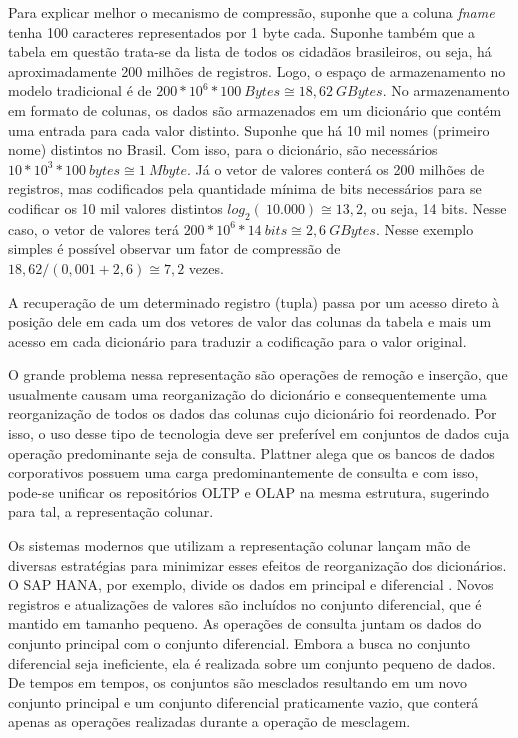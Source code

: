 Para explicar melhor o mecanismo de compressão, suponhe que a coluna \emph{fname} tenha 
100 caracteres representados por 1 byte cada. Suponhe também que a tabela em questão trata-se 
da lista de todos os cidadãos brasileiros, ou seja, há aproximadamente 200 milhões de registros. 
Logo, o espaço de armazenamento no modelo tradicional é de $200*10^6 * 100~Bytes \cong 18,62~GBytes$. 
No armazenamento em formato de colunas, os dados são armazenados em um dicionário que contém uma 
entrada para cada valor distinto. Suponhe que há 10 mil nomes (primeiro nome) distintos no Brasil. 
Com isso, para o dicionário, são necessários $10*10^3 * 100~bytes \cong 1~Mbyte$. Já o vetor de 
valores conterá os 200 milhões de registros, mas codificados pela quantidade mínima de bits 
necessários para se codificar os 10 mil valores distintos $log_2(~10.000) \cong 13,2$, ou seja, 
14 bits. Nesse caso, o vetor de valores terá $200*10^6 * 14~bits \cong 2,6~GBytes$. Nesse exemplo simples 
é possível observar um fator de compressão de $18,62 / (0,001 + 2,6) \cong 7,2$ vezes.

A recuperação de um determinado registro (tupla) passa por um acesso direto à posição dele em 
cada um dos vetores de valor das colunas da tabela e mais um acesso em cada dicionário para traduzir 
a codificação para o valor original.

O grande problema nessa representação são operações de remoção e inserção, que usualmente causam uma 
reorganização do dicionário e consequentemente uma reorganização de todos os dados das colunas cujo 
dicionário foi reordenado. Por isso, o uso desse tipo de tecnologia deve ser preferível em conjuntos 
de dados cuja operação predominante seja de consulta. Plattner \citep{plattner2009common} alega que 
os bancos de dados corporativos possuem uma carga predominantemente de consulta e com isso, 
pode-se unificar os repositórios OLTP e OLAP na mesma estrutura, sugerindo para tal, a representação colunar. 

Os sistemas modernos que utilizam a representação colunar lançam mão de diversas estratégias para 
minimizar esses efeitos de reorganização dos dicionários. O SAP HANA, por exemplo, divide os dados 
em principal e diferencial \citep{plattner2012memory}. Novos registros e atualizações de valores são 
incluídos no conjunto diferencial, que é mantido em tamanho pequeno. As operações de consulta juntam 
os dados do conjunto principal com o conjunto diferencial. Embora a busca no conjunto diferencial seja 
ineficiente, ela é realizada sobre um conjunto pequeno de dados. De tempos em tempos, os conjuntos são 
mesclados resultando em um novo conjunto principal e um conjunto diferencial praticamente vazio, que 
conterá apenas as operações realizadas durante a operação de mesclagem. 

